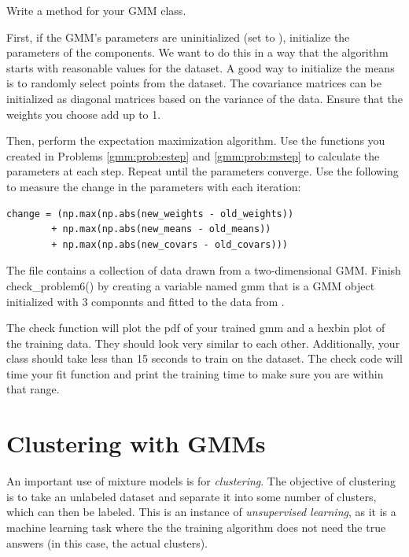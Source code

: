 \begin{problem}
Write a  method for your GMM class.

First, if the GMM's parameters are uninitialized (set to ), initialize the parameters of the components.
We want to do this in a way that the algorithm starts with reasonable values for the dataset.
A good way to initialize the means is to randomly select points from the dataset.
The covariance matrices can be initialized as diagonal matrices based on the variance of the data.
Ensure that the weights you choose add up to 1.%

Then, perform the expectation maximization algorithm.
Use the functions you created in Problems \ref{gmm:prob:estep} and \ref{gmm:prob:mstep} to calculate the parameters at each step.
Repeat until the parameters converge.
Use the following to measure the change in the parameters with each iteration:
\begin{lstlisting}
change = (np.max(np.abs(new_weights - old_weights))
        + np.max(np.abs(new_means - old_means))
        + np.max(np.abs(new_covars - old_covars)))
\end{lstlisting}%

The file  contains a collection of data drawn from a two-dimensional GMM.
Finish check\_problem6() by creating a variable named gmm that is a GMM object initialized with 3 
componnts and fitted to the data from  . 

The check function will plot the pdf of your trained gmm and a hexbin plot of the training data. They should
look very similar to each other. Additionally, your class should take less than 15 seconds to train on the dataset. 
The check code will time your fit function and print the training time to make sure you are within that range.
\end{problem}

\section*{Clustering with GMMs}

An important use of mixture models is for \emph{clustering}.
The objective of clustering is to take an unlabeled dataset and separate it into some number of clusters, which can then be labeled.
This is an instance of \emph{unsupervised learning}, as it is a machine learning task where the the training algorithm does not need the true answers (in this case, the actual clusters).

